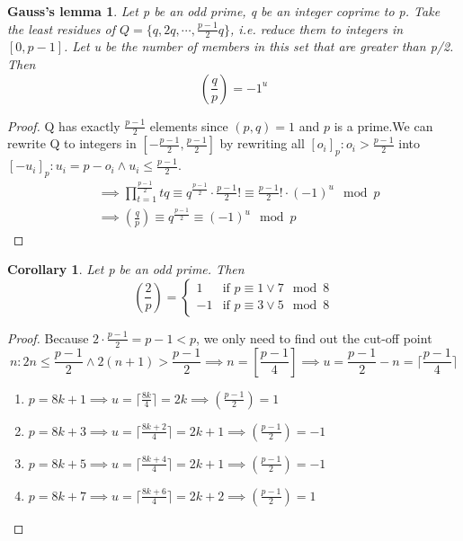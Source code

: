 \documentclass{article}
\newtheorem*{thm}{Gauss's lemma}
\newtheorem*{cor}{Corollary}
\theoremstyle{definition}\newtheorem{definition}{Definition}
\begin{document}
	\begin{thm}
		Let p be an odd prime, q be an integer coprime to p. Take the least residues of $Q=\{q, 2q,\cdots,\frac{p-1}{2} q \}$, i.e. reduce them to integers in $[0, p-1]$. Let u be the number of members in this set that are greater than p/2. Then
		$$
		(\frac{q}{p})=-1^u
		$$
	\end{thm}
	
	\begin{proof}
		Q has exactly $\frac{p-1}{2}$ elements since $(p, q)=1$ and $p$ is a prime.We can rewrite Q to integers in $[-\frac{p-1}{2},\frac{p-1}{2}]$ by rewriting all $[o_i]_p : o_i>\frac{p-1}{2}$ into  $[-u_i]_p : u_i=p-o_i \land u_i\leq \frac{p-1}{2}$.
		\begin{align*}
		&\implies \prod_{t=1}^{\frac{p-1}{2}}tq\equiv q^{\frac{p-1}{2}}\cdot {\frac{p-1}{2}}!\equiv{\frac{p-1}{2}}! \cdot (-1)^u \mod p \\
		&\implies (\frac{q}{p}) \equiv q^{\frac{p-1}{2}} \equiv (-1)^u \mod p \tag*{(By Euler's Criterion)}
		\end{align*}
	\end{proof}
	
	\begin{cor}
		Let p be an odd prime. Then
		\begin{equation*}
			(\frac{2}{p})=
				\begin{cases}
					1 & \text{if } p\equiv1 \lor 7 \mod 8 \\
					-1 & \text{if } p\equiv3 \lor 5 \mod 8
				\end{cases}
		\end{equation*}	
	\end{cor}
	
	\begin{proof}
		Because $2\cdot\frac{p-1}{2}=p-1<p$, we only need to find out the cut-off point 
		$$
		n:2n\leq\frac{p-1}{2} \land 2(n+1)>\frac{p-1}{2} \implies n=[\frac{p-1}{4}] \implies u=\frac{p-1}{2}-n=\lceil \frac{p-1}{4} \rceil
		$$
		\begin{enumerate}
			\item $p=8k+1 \implies u=\lceil \frac{8k}{4} \rceil=2k \implies (\frac{p-1}{2})=1$
			\item $p=8k+3 \implies u=\lceil \frac{8k+2}{4} \rceil=2k+1 \implies (\frac{p-1}{2})=-1$
			\item $p=8k+5 \implies u=\lceil \frac{8k+4}{4} \rceil=2k+1 \implies (\frac{p-1}{2})=-1$
			\item $p=8k+7 \implies u=\lceil \frac{8k+6}{4} \rceil=2k+2 \implies (\frac{p-1}{2})=1$
		\end{enumerate}
	\end{proof}
		
\end{document}
